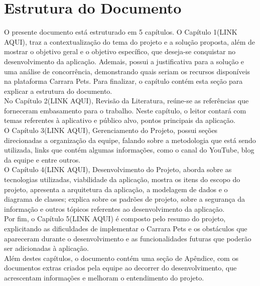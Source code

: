 \section{Estrutura do Documento}
O presente documento está estruturado em 5 capítulos. O Capítulo 1(LINK AQUI), traz a contextualização do tema do projeto e a solução proposta, além de mostrar o objetivo geral e o objetivo específico, que deseja-se conquistar no desenvolvimento da aplicação. Ademais, possui a justificativa para a solução e uma análise de concorrência, demonstrando quais seriam os recursos disponíveis na plataforma Carrara Pets. Para finalizar, o capítulo contém esta seção para explicar a estrutura do documento. \\
No Capítulo 2(LINK AQUI), Revisão da Literatura, reúne-se as referências que forneceram embasamento para o trabalho. Neste capítulo, o leitor contará com temas referentes à aplicativo e público alvo, pontos principais da aplicação.\\
O Capítulo 3(LINK AQUI), Gerenciamento do Projeto, possui seções direcionadas a organização da equipe, falando sobre a metodologia que está sendo utilizada, links que contém algumas informações, como o canal do YouTube, blog da equipe e entre outros. \\
O Capítulo 4(LINK AQUI), Desenvolvimento do Projeto, aborda sobre as tecnologias utilizadas, viabilidade da aplicação, mostra os itens do escopo do projeto, apresenta a arquitetura da aplicação, a modelagem de dados e o diagrama de classes; explica sobre os padrões de projeto, sobre a segurança da informação e outros tópicos referentes ao desenvolvimento da aplicação.\\
Por fim, o Capítulo 5(LINK AQUI) é composto pelo resumo do projeto, explicitando as dificuldades de implementar o Carrara Pets e os obstáculos que apareceram durante o desenvolvimento e as funcionalidades futuras que poderão ser adicionadas à aplicação.\\
Além destes capítulos, o documento contém uma seção de Apêndice, com os documentos extras criados pela equipe ao decorrer do desenvolvimento, que acrescentam informações e melhoram o entendimento do projeto.


\newpage
